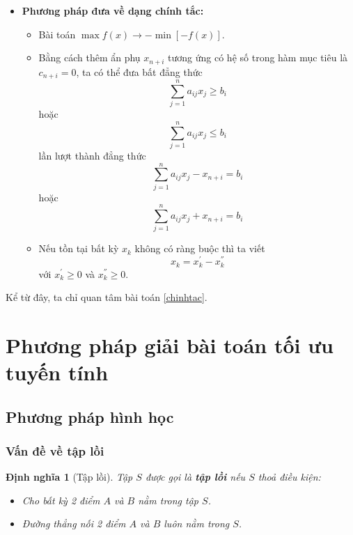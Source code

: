 \documentclass[12pt,a4paper]{report}
\newtheorem{dn}{Định nghĩa}
\begin{document}
\begin{itemize}
\item \textbf{Phương pháp đưa về dạng chính tắc:}
    \begin{itemize}
    \item Bài toán $\max f(x) \longrightarrow -\min [-f(x)]$.
    \item Bằng cách thêm ẩn phụ $x_{n+i}$ tương ứng có hệ số trong hàm mục tiêu là $c_{n+i}=0$, ta có thể đưa bất đẳng thức 
    \begin{equation*}
    \sum _{j=1}^n a_{ij} x_j \geq b_i
    \end{equation*}
    hoặc
    \begin{equation*}
    \sum _{j=1}^n a_{ij} x_j \leq b_i
    \end{equation*}
    lần lượt thành đẳng thức
    \begin{equation*}
    \sum _{j=1}^n a_{ij} x_j - x_{n+i} = b_i
    \end{equation*}
    hoặc
    \begin{equation*}
    \sum _{j=1}^n a_{ij} x_j + x_{n+i} = b_i
    \end{equation*}
    \item Nếu tồn tại bất kỳ $x_k$ không có ràng buộc thì ta viết
    \begin{equation*}
    x_k = x_k^{'} - x_k^{''}
    \end{equation*}
    với $x_k^{'} \geq 0$ và $x_k^{''} \geq 0$.
    \end{itemize}
\end{itemize}
Kể từ đây, ta chỉ quan tâm bài toán \eqref{chinhtac}.


\section{Phương pháp giải bài toán tối ưu tuyến tính}

\subsection{Phương pháp hình học}
\subsubsection*{Vấn đề về tập lồi}
\usetikzlibrary{patterns}

\begin{dn}[Tập lồi]
Tập $S$ được gọi là \textbf{tập lồi} nếu $S$ thoả điều kiện:
\begin{itemize}
\item Cho bất kỳ 2 điểm $A$ và $B$ nằm trong tập $S$.
\item Đường thẳng nối 2 điểm $A$ và $B$ luôn nằm trong $S$.
\end{itemize}
\end{dn}
\end{document}
